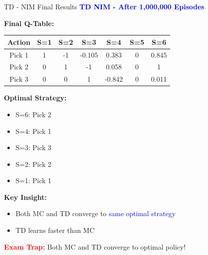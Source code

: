 \documentclass[8pt]{beamer}
\begin{document}
\begin{frame}{TD - NIM Final Results}
\fontsize{6.5}{7.5}\selectfont
\textcolor{blue}{\textbf{TD NIM - After 1,000,000 Episodes}}

\textbf{Final Q-Table:}
\begin{tabular}{|c|c|c|c|c|c|c|}
\hline
Action & S=1 & S=2 & S=3 & S=4 & S=5 & S=6 \\
\hline
Pick 1 & 1 & -1 & -0.105 & 0.383 & 0 & 0.845 \\
\hline
Pick 2 & 0 & 1 & -1 & 0.058 & 0 & 1 \\
\hline
Pick 3 & 0 & 0 & 1 & -0.842 & 0 & 0.011 \\
\hline
\end{tabular}

\textbf{Optimal Strategy:}
\begin{itemize}
\item S=6: Pick 2
\item S=4: Pick 1
\item S=3: Pick 3
\item S=2: Pick 2
\item S=1: Pick 1
\end{itemize}

\textbf{Key Insight:}
\begin{itemize}
\item Both MC and TD converge to \textcolor{blue}{same optimal strategy}
\item TD learns faster than MC
\end{itemize}

\textcolor{red}{\textbf{Exam Trap:}} Both MC and TD converge to optimal policy!
\end{frame}
\end{document}
